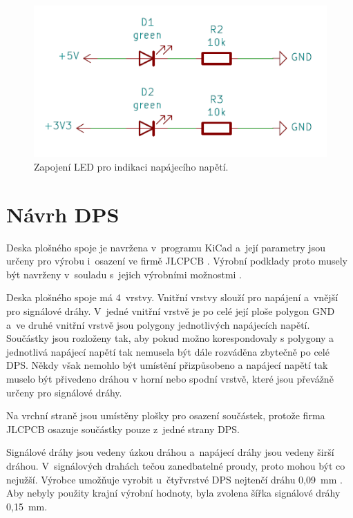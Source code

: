   \begin{figure}[!h]
    \begin{center}
      \includegraphics[scale=0.6]{obrazky/powerLED.png}
    \end{center}
    \caption[Zapojení LED pro indikaci napájecího napětí]{Zapojení LED pro indikaci napájecího napětí.}
  \end{figure}

  \chapter{Návrh DPS}
  Deska plošného spoje je navržena v~programu KiCad a~její parametry jsou určeny pro výrobu i~osazení ve firmě JLCPCB \cite{KiCad} \cite{JLCPCB}. Výrobní 
  podklady proto musely být navrženy v~souladu s~jejich výrobními možnostmi \cite{JLCPCB_Capabilities}.

  Deska plošného spoje má 4~vrstvy. Vnitřní vrstvy slouží pro napájení a~vnější pro signálové dráhy. V~jedné vnitřní vrstvě je po celé její ploše 
  polygon GND a~ve druhé vnitřní vrstvě jsou polygony jednotlivých napájecích napětí. Součástky jsou rozloženy tak, aby pokud možno
  korespondovaly s polygony a jednotlivá napájecí napětí tak nemusela být dále rozváděna zbytečně po celé DPS. Někdy však nemohlo být umístění 
  přizpůsobeno a napájecí napětí tak muselo být přivedeno dráhou v horní nebo spodní vrstvě, které jsou převážně určeny pro signálové 
  dráhy. 

  Na vrchní straně jsou umístěny plošky pro osazení součástek, protože firma JLCPCB osazuje součástky pouze z~jedné strany DPS.

  Signálové dráhy jsou vedeny úzkou dráhou a~napájecí dráhy jsou vedeny širší dráhou. V~signálových drahách tečou zanedbatelné 
  proudy, proto mohou být co nejužší. Výrobce umožňuje vyrobit u~čtyřvrstvé DPS nejtenčí dráhu 0,09~mm \cite{JLCPCB_Capabilities}. 
  Aby nebyly použity krajní výrobní hodnoty, byla zvolena šířka signálové dráhy 0,15~mm.

